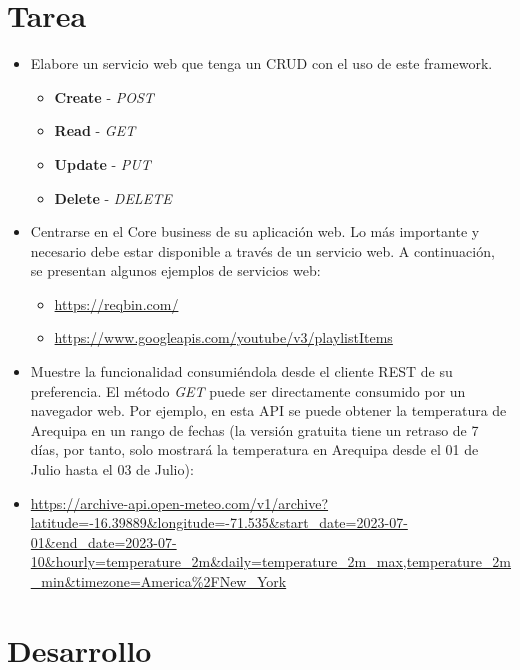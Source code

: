 \documentclass{article}
\begin{document}
	\section{Tarea}
	
	\begin{itemize}
		\item Elabore un servicio web que tenga un CRUD con el uso de este framework.
		
		\begin{itemize}
			\item \textbf{Create} - \textit{POST}
			\item \textbf{Read} - \textit{GET}
			\item \textbf{Update} - \textit{PUT}
			\item \textbf{Delete} - \textit{DELETE}
		\end{itemize}
		
		\item Centrarse en el Core business de su aplicación web. Lo más importante y necesario debe estar disponible a través de un servicio web. A continuación, se presentan algunos ejemplos de servicios web:
		
		\begin{itemize}
			\item \url{https://reqbin.com/}
			\item \url{https://www.googleapis.com/youtube/v3/playlistItems}
		\end{itemize}
		
		\item Muestre la funcionalidad consumiéndola desde el cliente REST de su preferencia. El método \textit{GET} puede ser directamente consumido por un navegador web. Por ejemplo, en esta API se puede obtener la temperatura de Arequipa en un rango de fechas (la versión gratuita tiene un retraso de 7 días, por tanto, solo mostrará la temperatura en Arequipa desde el 01 de Julio hasta el 03 de Julio): 
		
		\item \url{https://archive-api.open-meteo.com/v1/archive?latitude=-16.39889&longitude=-71.535&start_date=2023-07-01&end_date=2023-07-10&hourly=temperature_2m&daily=temperature_2m_max,temperature_2m_min&timezone=America%2FNew_York}
		
	\end{itemize}

	\section{Desarrollo}
	
\end{document}
